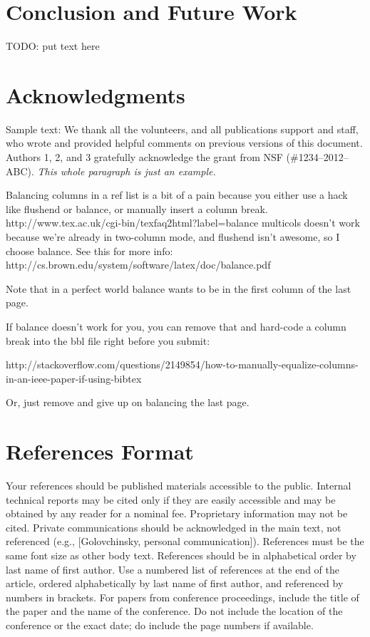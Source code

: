 \documentclass{sigchi}
\begin{document}
\section{Conclusion and Future Work}

TODO: put text here

\section{Acknowledgments}

Sample text: We thank all the volunteers, and all publications support
and staff, who wrote and provided helpful comments on previous
versions of this document. Authors 1, 2, and 3 gratefully acknowledge
the grant from NSF (\#1234--2012--ABC). \textit{This whole paragraph is
  just an example.}

 Balancing columns in a ref list is a bit of a pain because you
 either use a hack like flushend or balance, or manually insert
 a column break.  http://www.tex.ac.uk/cgi-bin/texfaq2html?label=balance
 multicols doesn't work because we're already in two-column mode,
 and flushend isn't awesome, so I choose balance.  See this
 for more info: http://cs.brown.edu/system/software/latex/doc/balance.pdf

 Note that in a perfect world balance wants to be in the first
 column of the last page.

 If balance doesn't work for you, you can remove that and
 hard-code a column break into the bbl file right before you
 submit:

 http://stackoverflow.com/questions/2149854/how-to-manually-equalize-columns-
 in-an-ieee-paper-if-using-bibtex

 Or, just remove \balance and give up on balancing the last page.

\balance{}

\section{References Format}
Your references should be published materials accessible to the
public. Internal technical reports may be cited only if they are
easily accessible and may be obtained by any reader for a nominal
fee. Proprietary information may not be cited. Private communications
should be acknowledged in the main text, not referenced (e.g.,
[Golovchinsky, personal communication]). References must be the same
font size as other body text. References should be in alphabetical
order by last name of first author. Use a numbered list of references
at the end of the article, ordered alphabetically by last name of
first author, and referenced by numbers in brackets. For papers from
conference proceedings, include the title of the paper and the name of
the conference. Do not include the location of the conference or the
exact date; do include the page numbers if available. 
\end{document}

